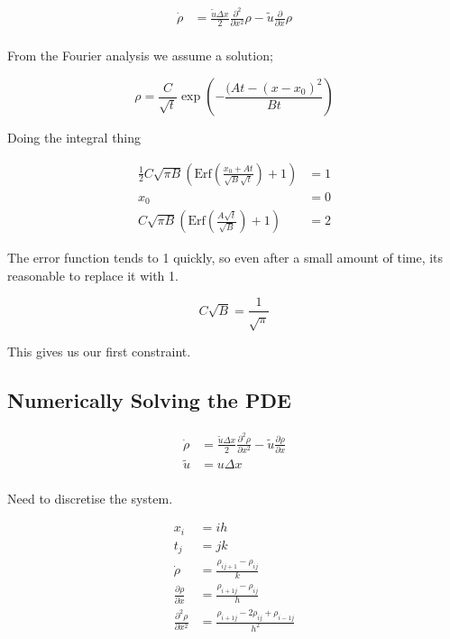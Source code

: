 \documentclass[a4paper]{article}
\begin{document}
\begin{align*}
\dot{\rho} & = \frac{\tilde{u} \Delta x}{2} \frac{\partial ^2}{\partial x ^2} \rho - \tilde{u} \frac{\partial}{\partial x} \rho \\
\end{align*}

From the Fourier analysis we assume a solution; 

\begin{equation}
\rho = \frac{C}{\sqrt{t}} \exp \left( - \frac{(At - (x-x_0)^2}{Bt} \right)
\end{equation}

Doing the integral thing 

\begin{align*}
\frac{1}{2} C \sqrt{\pi B} \left( \text{Erf} \left( \frac{x_0 + At}{\sqrt{B} \sqrt{t}} \right) + 1 \right) & = 1 \\ 
x_0 & = 0 \\
C \sqrt{\pi B} \left( \text{Erf} \left( \frac{A \sqrt{t}}{\sqrt{B}} \right) + 1 \right) & = 2
\end{align*}

The error function tends to 1 quickly, so even after a small amount of time, its reasonable to replace it with 1. 

\begin{equation}
C \sqrt{B} = \frac{1}{\sqrt{\pi}}
\end{equation}

This gives us our first constraint. 

\subsection{Numerically Solving the PDE}

\begin{align*}
\dot{\rho} & = \frac{\tilde{u} \Delta x}{2} \frac{\partial ^2 \rho}{\partial x^2} - \tilde{u} \frac{\partial \rho}{\partial x} \\
\tilde{u} & = u \Delta	x \\
\end{align*}

Need to discretise the system. 

\begin{align*}
x_i & =  ih \\
t_j & = jk \\
\dot{\rho} & = \frac{ \rho _{i j+1} - \rho_{ij} }{k} \\
\frac{\partial \rho}{\partial x} & = \frac{\rho _{i+1 j} - \rho _{ij}}{h} \\
\frac{\partial ^2 \rho}{\partial x ^2} & = \frac{\rho _{i+1 j} - 2 \rho _{ij} + \rho_{i-1 j}}{h^2} \\
\end{align*}
\end{document}

